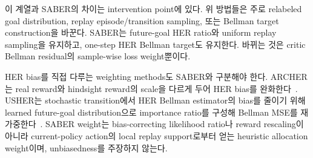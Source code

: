 \documentclass[letterpaper]{article}
\begin{document}
이 계열과 SABER의 차이는 intervention point에 있다. 위 방법들은 주로 relabeled goal distribution, replay episode/transition sampling, 또는 Bellman target construction을 바꾼다. SABER는 future-goal HER ratio와 uniform replay sampling을 유지하고, one-step HER Bellman target도 유지한다. 바뀌는 것은 critic Bellman residual의 sample-wise loss weight뿐이다.

HER bias를 직접 다루는 weighting methods도 SABER와 구분해야 한다. ARCHER는 real reward와 hindsight reward의 scale을 다르게 두어 HER bias를 완화한다~\citep{lanka2018archer}. USHER는 stochastic transition에서 HER Bellman estimator의 bias를 줄이기 위해 learned future-goal distribution으로 importance ratio를 구성해 Bellman MSE를 재가중한다~\citep{schramm2023usher}. SABER weight는 bias-correcting likelihood ratio나 reward rescaling이 아니라 current-policy action의 local replay support로부터 얻는 heuristic allocation weight이며, unbiasedness를 주장하지 않는다.
\end{document}
